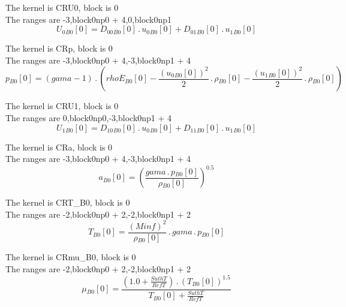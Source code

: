 \documentclass{article}
\begin{document}
\noindent The kernel is CRU0, block is 0\\\noindent The ranges are -3,block0np0 + 4,0,block0np1\\\begin{dmath}{U_{0}{_{B0}}}[{0}] = {D_{00}{_{B0}}}[{0}] \,.\, {u_{0}{_{B0}}}[{0}] + {D_{01}{_{B0}}}[{0}] \,.\, {u_{1}{_{B0}}}[{0}]\end{dmath}

\noindent The kernel is CRp, block is 0\\\noindent The ranges are -3,block0np0 + 4,-3,block0np1 + 4\\\begin{dmath}{p{_{B0}}}[{0}] = \left(gama - 1\right) \,.\, \left({rhoE{_{B0}}}[{0}] - \frac{\left({u_{0}{_{B0}}}[{0}] \right)^{2}}{2} \,.\, {\rho{_{B0}}}[{0}] - \frac{\left({u_{1}{_{B0}}}[{0}] \right)^{2}}{2} \,.\, 
{\rho{_{B0}}}[{0}]\right)\end{dmath}

\noindent The kernel is CRU1, block is 0\\\noindent The ranges are 0,block0np0,-3,block0np1 + 4\\\begin{dmath}{U_{1}{_{B0}}}[{0}] = {D_{10}{_{B0}}}[{0}] \,.\, {u_{0}{_{B0}}}[{0}] + {D_{11}{_{B0}}}[{0}] \,.\, {u_{1}{_{B0}}}[{0}]\end{dmath}

\noindent The kernel is CRa, block is 0\\\noindent The ranges are -3,block0np0 + 4,-3,block0np1 + 4\\\begin{dmath}{a{_{B0}}}[{0}] = \left(\frac{gama \,.\, {p{_{B0}}}[{0}]}{{\rho{_{B0}}}[{0}]} \right)^{0.5}\end{dmath}

\noindent The kernel is CRT_B0, block is 0\\\noindent The ranges are -2,block0np0 + 2,-2,block0np1 + 2\\\begin{dmath}{T{_{B0}}}[{0}] = \frac{\left(Minf \right)^{2}}{{\rho{_{B0}}}[{0}]} \,.\, gama \,.\, {p{_{B0}}}[{0}]\end{dmath}

\noindent The kernel is CRmu_B0, block is 0\\\noindent The ranges are -2,block0np0 + 2,-2,block0np1 + 2\\\begin{dmath}{\mu{_{B0}}}[{0}] = \frac{\left(1.0 + \frac{SuthT}{RefT}\right) \,.\, \left({T{_{B0}}}[{0}] \right)^{1.5}}{{T{_{B0}}}[{0}] + \frac{SuthT}{RefT}}\end{dmath}
\end{document}
